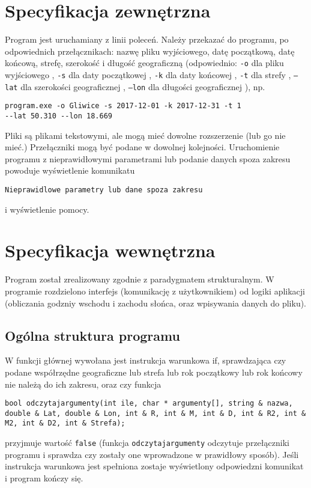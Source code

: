 \documentclass[12pt,a4paper]{article}
\begin{document}
 
\section{Specyfikacja zewnętrzna}
\label{sec:sp:zewnetrzna}
Program jest uruchamiany z linii poleceń. 
Należy przekazać do programu, po odpowiednich przełącznikach: nazwę pliku wyjściowego, datę początkową, datę końcową, strefę, szerokość i długość geograficzną  (odpowiednio: \texttt{-o} dla pliku wyjściowego , \texttt{-s} dla daty początkowej , \texttt{-k} dla daty końcowej , \texttt{-t} dla strefy , \texttt{--lat} dla szerokości geograficznej , \texttt{--lon} dla długości geograficznej ), np.
\begin{verbatim}
program.exe -o Gliwice -s 2017-12-01 -k 2017-12-31 -t 1 
--lat 50.310 --lon 18.669
\end{verbatim}
Pliki są plikami tekstowymi, ale mogą mieć dowolne rozszerzenie (lub go nie mieć.) Przełączniki mogą być podane w dowolnej kolejności. Uruchomienie programu z nieprawidłowymi parametrami lub podanie danych spoza zakresu powoduje wyświetlenie komunikatu 
\begin{verbatim}
Nieprawidlowe parametry lub dane spoza zakresu
\end{verbatim}
i wyświetlenie pomocy. 



\section{Specyfikacja wewnętrzna}\label{sec:sp-wew}
 Program został zrealizowany zgodnie z paradygmatem strukturalnym.  
W programie rozdzielono interfejs (komunikację z użytkownikiem) od logiki aplikacji (obliczania godzniy wschodu i zachodu słońca, oraz wpisywania danych do pliku).

\subsection{Ogólna struktura programu}
W funkcji głównej wywołana jest instrukcja warunkowa if, sprawdzająca czy podane współrzędne geograficzne lub strefa lub rok początkowy lub rok końcowy nie należą do ich zakresu, oraz czy funkcja 
\begin{lstlisting}
bool odczytajargumenty(int ile, char * argumenty[], string & nazwa, double & Lat, double & Lon, int & R, int & M, int & D, int & R2, int & M2, int & D2, int & Strefa);
\end{lstlisting}
przyjmuje wartość \lstinline!false! (funkcja \lstinline|odczytajargumenty| odczytuje przełączniki programu i sprawdza czy zostały one wprowadzone w prawidłowy sposób). Jeśli instrukcja warunkowa jest spełniona zostaje wyświetlony odpowiedzni komunikat i program kończy się.
\end{document}

